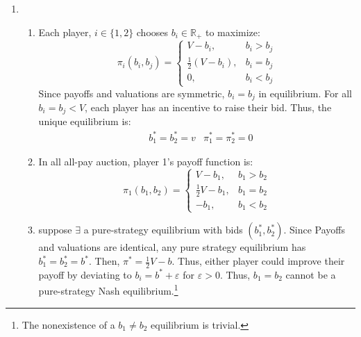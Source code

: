 \documentclass{article}
\newcommand{\R}{\mathbb{R}}
\begin{document}
\begin{enumerate}
  \item  
  \begin{enumerate}
    \item Each player, $i\in\{1,2\}$ chooses $b_i\in\R_+$ to maximize: \[
      \pi_i(b_i,b_j) = \begin{cases}
        V-b_i,&b_i>b_j  \\
        \frac{1}{2}\left(V-b_i\right),&b_i=b_j \\
        0,&b_i<b_j
      \end{cases}
    \]
    Since payoffs and valuations are symmetric, $b_i=b_j$ in equilibrium. For all $b_i=b_j<V$, each player has an incentive to raise their bid. Thus, the unique equilibrium is:
    \begin{align*}
      &b_1^*=b_2^*=v & \pi_1^*=\pi_2^*=0
    \end{align*}

    \item In all all-pay auction, player 1's payoff function is: 
    \[
      \pi_1(b_1,b_2) = \begin{cases}
        V-b_1,&b_1>b_2  \\
        \frac{1}{2}V-b_1,&b_1=b_2 \\
        -b_1,&b_1<b_2
      \end{cases}
    \]

    \item suppose $\exists$ a pure-strategy equilibrium with bids $(b_1^*,b_2^*)$. Since Payoffs and valuations are identical, any pure strategy equilibrium has ${b_1^*=b_2^*=b^*}$. Then, ${\pi^*=\frac{1}{2}V-b}$. Thus, either player could improve their payoff by deviating to ${b_i = b^*+\varepsilon}$ for $\varepsilon>0$. Thus, $b_1=b_2$ cannot be a pure-strategy Nash equilibrium.\footnote{The nonexistence of a $b_1\neq b_2$ equilibrium is trivial.}


\end{enumerate}
\end{enumerate}
\end{document}
